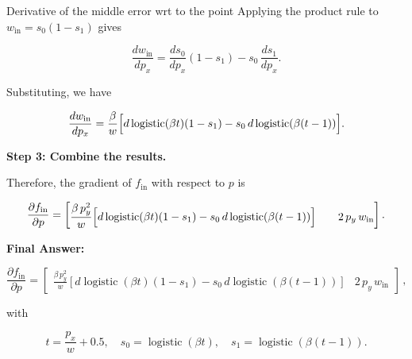 \documentclass[11pt]{article}
\begin{document}
\begin{section}{Derivative of the middle error wrt to the point}
    Applying the product rule to \(w_{\mathrm{in}} = s_0(1-s_1)\) gives

    \begin{equation}
        \frac{d w_{\mathrm{in}}}{d p_x} = \frac{d s_0}{d p_x}(1-s_1) - s_0\,\frac{d s_1}{d p_x}.
    \end{equation}

    Substituting, we have

    \begin{equation}
        \frac{d w_{\mathrm{in}}}{d p_x} = \frac{\beta}{w}\Bigl[ d\operatorname{logistic}(\beta t)(1-s_1) - s_0\,d\operatorname{logistic}(\beta(t-1)) \Bigr].
    \end{equation}

    \textbf{Step 3: Combine the results.}

    Therefore, the gradient of \(f_{\mathrm{in}}\) with respect to \(p\) is

    \begin{equation}
        \frac{\partial f_{\mathrm{in}}}{\partial p} =
        \begin{bmatrix}
            \displaystyle \frac{\beta\,p_y^2}{w}\Bigl[d\operatorname{logistic}(\beta t)(1-s_1) - s_0\,d\operatorname{logistic}(\beta(t-1))\Bigr] & \quad 2\,p_y\,w_{\mathrm{in}}
        \end{bmatrix}.
    \end{equation}

    \textbf{Final Answer:}

    \begin{equation}
        \boxed{
            \frac{\partial f_{\mathrm{in}}}{\partial p} =
            \begin{bmatrix}
                \displaystyle \frac{\beta\,p_y^2}{w}\left[d\operatorname{logistic}(\beta t)(1-s_1) - s_0\,d\operatorname{logistic}(\beta(t-1))\right] & 2\,p_y\,w_{\mathrm{in}}
            \end{bmatrix}\,,
        }
    \end{equation}

    with

    \begin{equation}
        t = \frac{p_x}{w} + 0.5,\quad s_0 = \operatorname{logistic}(\beta t),\quad s_1 = \operatorname{logistic}(\beta(t-1)).
    \end{equation}

\end{section}
\end{document}
